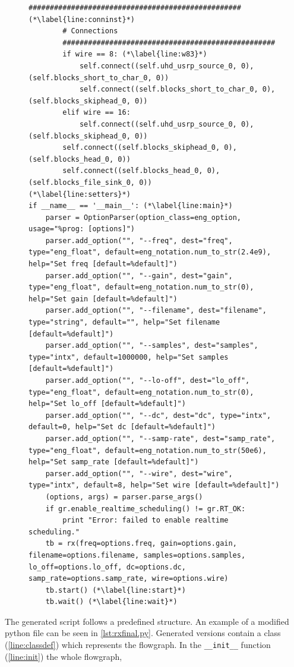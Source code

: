 \documentclass[12pt,a4paper,parskip=full,abstracton]{scrartcl}
\begin{document}
\begin{figure}[htbp]
\begin{lstlisting}[basicstyle=\tiny,caption={Generated RX flowgraph module with modifications ({\ttfamily rx\_final.py)}},label=lst:rxfinal.py]
        ################################################## (*\label{line:conninst}*)
        # Connections
        ##################################################
        if wire == 8: (*\label{line:w83}*)
            self.connect((self.uhd_usrp_source_0, 0), (self.blocks_short_to_char_0, 0))
            self.connect((self.blocks_short_to_char_0, 0), (self.blocks_skiphead_0, 0))
        elif wire == 16:
            self.connect((self.uhd_usrp_source_0, 0), (self.blocks_skiphead_0, 0))
        self.connect((self.blocks_skiphead_0, 0), (self.blocks_head_0, 0))
        self.connect((self.blocks_head_0, 0), (self.blocks_file_sink_0, 0))
(*\label{line:setters}*)
if __name__ == '__main__': (*\label{line:main}*)
    parser = OptionParser(option_class=eng_option, usage="%prog: [options]")
    parser.add_option("", "--freq", dest="freq", type="eng_float", default=eng_notation.num_to_str(2.4e9), help="Set freq [default=%default]")
    parser.add_option("", "--gain", dest="gain", type="eng_float", default=eng_notation.num_to_str(0), help="Set gain [default=%default]")
    parser.add_option("", "--filename", dest="filename", type="string", default="", help="Set filename [default=%default]")
    parser.add_option("", "--samples", dest="samples", type="intx", default=1000000, help="Set samples [default=%default]")
    parser.add_option("", "--lo-off", dest="lo_off", type="eng_float", default=eng_notation.num_to_str(0), help="Set lo_off [default=%default]")
    parser.add_option("", "--dc", dest="dc", type="intx", default=0, help="Set dc [default=%default]")
    parser.add_option("", "--samp-rate", dest="samp_rate", type="eng_float", default=eng_notation.num_to_str(50e6), help="Set samp_rate [default=%default]")
    parser.add_option("", "--wire", dest="wire", type="intx", default=8, help="Set wire [default=%default]")
    (options, args) = parser.parse_args()
    if gr.enable_realtime_scheduling() != gr.RT_OK:
        print "Error: failed to enable realtime scheduling."
    tb = rx(freq=options.freq, gain=options.gain, filename=options.filename, samples=options.samples, lo_off=options.lo_off, dc=options.dc, samp_rate=options.samp_rate, wire=options.wire)
    tb.start() (*\label{line:start}*)
    tb.wait() (*\label{line:wait}*)
    \end{lstlisting}
\end{figure}
The generated script follows a predefined structure. An example of a modified python
file can be seen in \cref{lst:rxfinal.py}. Generated versions contain a class
(\cref{line:classdef}) which represents the flowgraph. In the
\lstinline{__init__} function (\cref{line:init}) the whole flowgraph,
\end{document}
